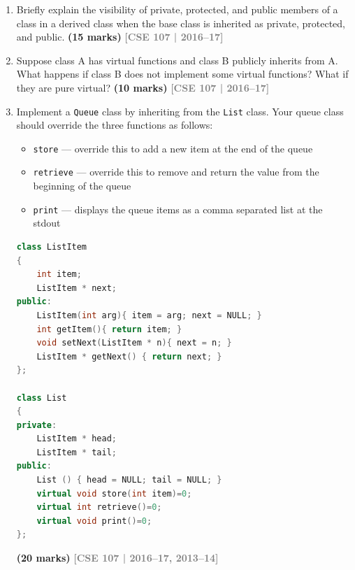 \documentclass[12pt,a3paper]{article}
\newcommand{\yr}[1]{\hfill\textcolor{gray}{\small\textbf{[#1]}}}
\newcommand{\mk}[1]{\textcolor{orange!70!black}{\small\textbf{(#1 marks)}}}
\begin{document}
\begin{enumerate}



\item Briefly explain the visibility of private, protected, and public members of a class in a derived class when the base class is inherited as private, protected, and public. \mk{15}
\yr{CSE 107 | 2016--17}



\item Suppose class A has virtual functions and class B publicly inherits from A. What happens if class B does not implement some virtual functions? What if they are pure virtual? \mk{10}
\yr{CSE 107 | 2016--17}





\item Implement a \texttt{Queue} class by inheriting from the \texttt{List} class. Your queue class should override the three functions as follows:
\begin{itemize}
    \item[(i)] \texttt{store} --- override this to add a new item at the end of the queue
    \item[(ii)] \texttt{retrieve} --- override this to remove and return the value from the beginning of the queue
    \item[(iii)] \texttt{print} --- displays the queue items as a comma separated list at the stdout
\end{itemize}

\begin{lstlisting}[language=C++]
class ListItem
{
    int item;
    ListItem * next;
public:
    ListItem(int arg){ item = arg; next = NULL; }
    int getItem(){ return item; }
    void setNext(ListItem * n){ next = n; }
    ListItem * getNext() { return next; }
};

class List
{
private:
    ListItem * head;
    ListItem * tail;
public:
    List () { head = NULL; tail = NULL; }
    virtual void store(int item)=0;
    virtual int retrieve()=0;
    virtual void print()=0;
};
\end{lstlisting}
\mk{20}
\yr{CSE 107 | 2016--17, 2013--14}




\end{enumerate}
\end{document}
